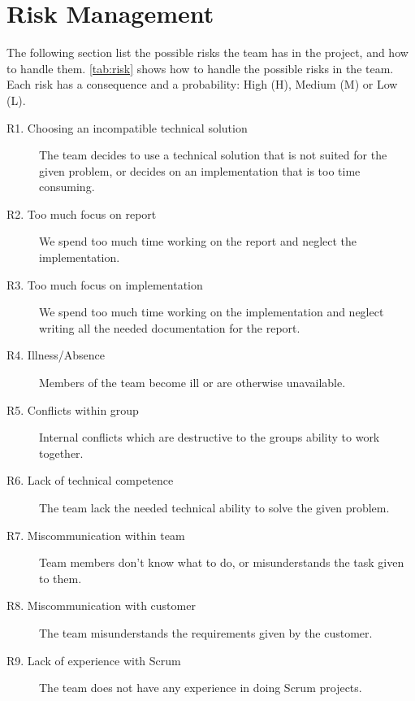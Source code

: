 \section{Risk Management}
The following section list the possible risks the team has in the project, and how to handle them. \autoref{tab:risk} shows how to handle the possible risks in the team. Each risk has a consequence and a probability:  High (H), Medium (M) or Low (L).
\begin{description}
\item[R1. Choosing an incompatible technical solution]  The team decides to use a technical solution that is not suited for the given problem, or decides on an implementation that is too time consuming.
\item[R2. Too much focus on report]   We spend too much time working on the report and neglect the implementation. 
\item[R3. Too much focus on implementation]  We spend too much time working on the implementation and neglect writing all the needed documentation for the report.
\item[R4. Illness/Absence]  Members of the team become ill or are otherwise unavailable. 
\item[R5. Conflicts within group]   Internal conflicts which are destructive to the groups ability to work together. 
\item[R6. Lack of technical competence]  The team lack the needed technical ability to solve the given problem. 
\item[R7. Miscommunication within team]  Team members don’t know what to do, or misunderstands the task given to them. 
\item[R8. Miscommunication with customer]  The team misunderstands the requirements given by the customer. 
\item[R9. Lack of experience with Scrum]  The team does not have any experience in doing Scrum projects.
\end{description}


